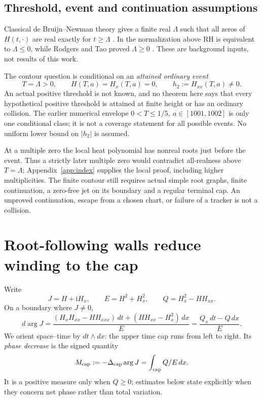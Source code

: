 \documentclass[11pt]{article}
\theoremstyle{definition}
\newcommand{\ii}{\mathrm i}
\begin{document}
\subsection{Threshold, event and continuation assumptions}
Classical de Bruijn--Newman theory gives a finite real \(\Lambda\) such
that all zeros of \(H(t,\cdot)\) are real exactly for \(t\ge\Lambda\)
\cite{debruijn,newman}. In the normalization above RH is equivalent to
\(\Lambda\le0\), while Rodgers and Tao proved \(\Lambda\ge0\)
\cite{rodgerstao}. These are background inputs, not results of this work.

The contour question is conditional on an \emph{attained ordinary event}
\[
 T=\Lambda>0,\qquad H(T,a)=H_x(T,a)=0,\qquad
 h_2:=H_{xx}(T,a)\ne0.
\]
An actual positive threshold is not known, and no theorem here says that
every hypothetical positive threshold is attained at finite height or
has an ordinary collision. The earlier numerical envelope
\(0<T\le1/5,\ a\in[1001,1002]\) is only one conditional class; it is
not a coverage statement for all possible events. No uniform lower
bound on \(|h_2|\) is assumed.

At a multiple zero the local heat polynomial has nonreal roots just
before the event. Thus a strictly later multiple zero would contradict
all-realness above \(T=\Lambda\); Appendix~\ref{app:index} supplies the
local proof, including higher multiplicities. The finite contour still
requires actual simple root graphs, finite continuation, a zero-free jet
on its boundary and a regular terminal cap. An unproved continuation,
escape from a chosen chart, or failure of a tracker is not a collision.

\section{Root-following walls reduce winding to the cap}
\label{sec:rootwalls}
Write
\[
 J=H+\ii H_x,\qquad E=H^2+H_x^2,\qquad
 Q=H_x^2-HH_{xx}.
\]
On a boundary where \(J\ne0\),
\begin{equation}
 d\arg J=
 \frac{(H_xH_{xx}-HH_{xxx})\,dt+
             (HH_{xx}-H_x^2)\,dx}{E}
 =\frac{Q_x\,dt-Q\,dx}{E}.                       \label{eq:winding}
\end{equation}
We orient space--time by \(dt\wedge dx\): the upper time cap runs
from left to right. Its \emph{phase decrease} is the signed quantity
\[
 M_{\rm cap}:=-\Delta_{\rm cap}\arg J=\int_{\rm cap}Q/E\,dx.
\]
It is a positive measure only when \(Q\ge0\); estimates below state
explicitly when they concern net phase rather than total variation.
\end{document}
